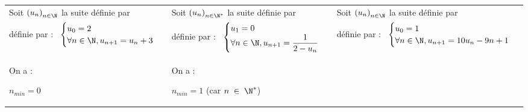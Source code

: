 \begin{tabular}{lll}

\hspace*{-2cm}

Soit $\left(u_n\right)_{n \in \N}$ la suite définie par &

\hspace*{-.6cm}

Soit $\left(u_n\right)_{n \in \N^*}$ la suite définie par &

\hspace*{-.3cm}

Soit $\left(u_n\right)_{n \in \N}$ la suite définie par \\

\hspace*{-2cm}

définie par :$ \; \; \; \begin{cases}
u_0 = 2 \\
\forall n \in \N, u_{n+1} = u_n + 3 \\
\end{cases}$ 

&

\hspace*{-.6cm}

définie par :$ \; \; \; \begin{cases}
u_1 = 0 \\
\forall n \in \N, u_{n+1} = \dfrac{1}{2 - u_n} \\
\end{cases}$ 

&

\hspace*{-.3cm}

définie par :$ \; \; \; \begin{cases}
u_0 = 1 \\
\forall n \in \N, u_{n+1} = 10u_n -9n + 1 \\
\end{cases}$ 

\vspace*{.5cm}

\\

\hspace*{-2cm}

On a :

$n_{min} = 0$ & 

\hspace*{-.6cm}

On a :

$n_{min} = 1$ (car $n \; \in \; \N^*$)


\end{tabular}
